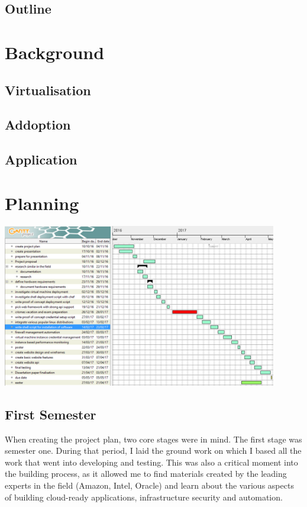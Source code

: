 \documentclass{article}
\begin{document}
\subsection{Outline}

\newpage
\section{Background}
\subsection{Virtualisation}
\subsection{Addoption}
\subsection{Application}
\newpage
\section{Planning}

\begin{center}
	\includegraphics[width=12cm]{gantt.jpg}
\end{center}

\subsection{First Semester}
When creating the project plan, two core stages were in mind. The first stage was semester one. During that period, I laid the ground work on which I based all the work that went into developing and testing. This was also a critical moment into the building process, as it allowed me to find materials created by the leading experts in the field (Amazon, Intel, Oracle) and learn about the various aspects of building cloud-ready applications, infrastructure security and automation.
\end{document}
